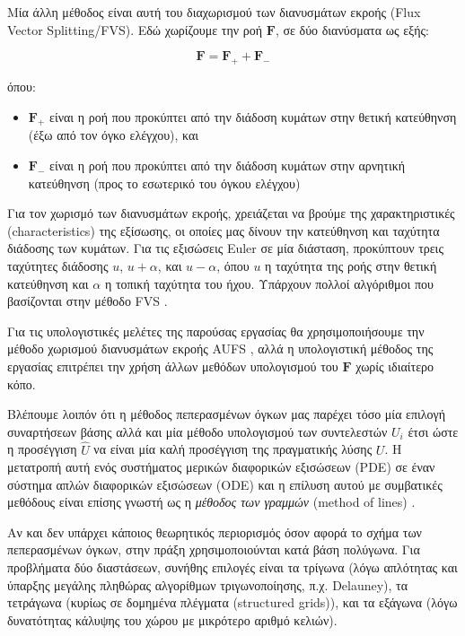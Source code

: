 Μία άλλη μέθοδος είναι αυτή του διαχωρισμού των διανυσμάτων εκροής (Flux Vector Splitting/FVS).
Εδώ χωρίζουμε την ροή $\mathbf{F}$, σε δύο διανύσματα ως εξής:

\begin{equation}
    \mathbf{F} = \mathbf{F}_{+} + \mathbf{F}_{-}
\end{equation}

όπου:
\begin{itemize}
    \item $\mathbf{F}_{+}$ είναι η ροή που προκύπτει από την διάδοση κυμάτων στην θετική κατεύθηνση (έξω από τον όγκο ελέγχου), και
    \item $\mathbf{F}_{-}$ είναι η ροή που προκύπτει από την διάδοση κυμάτων στην αρνητική κατεύθηνση (προς το εσωτερικό του όγκου ελέγχου)
\end{itemize}

Για τον χωρισμό των διανυσμάτων εκροής, χρειάζεται να βρούμε της χαρακτηριστικές (characteristics) της εξίσωσης, οι οποίες μας δίνουν την κατεύθηνση και ταχύτητα διάδοσης των κυμάτων.
Για τις εξισώσεις Euler σε μία διάσταση, προκύπτουν τρεις ταχύτητες διάδοσης $u$, $u + \alpha$, και $u - \alpha$, όπου $u$ η ταχύτητα της ροής στην θετική κατεύθηνση και $\alpha$ η τοπική ταχύτητα του ήχου.
Υπάρχουν πολλοί αλγόριθμοι που βασίζονται στην μέθοδο FVS \cite{Toro2012}.

Για τις υπολογιστικές μελέτες της παρούσας εργασίας θα χρησιμοποιήσουμε την μέθοδο χωρισμού διανυσμάτων εκροής AUFS \cite{Sun2003}, αλλά η υπολογιστική μέθοδος της εργασίας επιτρέπει την χρήση άλλων μεθόδων υπολογισμού του $\mathbf{F}$ χωρίς ιδιαίτερο κόπο.

Βλέπουμε λοιπόν ότι η μέθοδος πεπερασμένων όγκων μας παρέχει τόσο μία επιλογή συναρτήσεων βάσης αλλά και μία μέθοδο υπολογισμού των συντελεστών $U_i$ έτσι ώστε η προσέγγιση $\hat{U}$ να είναι μία καλή προσέγγιση της πραγματικής λύσης $U$.
Η μετατροπή αυτή ενός συστήματος μερικών διαφορικών εξισώσεων (PDE) σε έναν σύστημα απλών διαφορικών εξισώσεων (ODE) και η επίλυση αυτού με συμβατικές μεθόδους είναι επίσης γνωστή ως η \emph{μέθοδος των γραμμών} (method of lines) \cite[p. ~352]{Solomon2015}.

Αν και δεν υπάρχει κάποιος θεωρητικός περιορισμός όσον αφορά το σχήμα των πεπερασμένων όγκων, στην πράξη χρησιμοποιούνται κατά βάση πολύγωνα.
Για προβλήματα δύο διαστάσεων, συνήθης επιλογές είναι τα τρίγωνα (λόγω απλότητας και ύπαρξης μεγάλης πληθώρας αλγορίθμων τριγωνοποίησης, π.χ. Delauney), τα τετράγωνα (κυρίως σε δομημένα πλέγματα (structured grids)), και τα εξάγωνα (λόγω δυνατότητας κάλυψης του χώρου με μικρότερο αριθμό κελιών).

